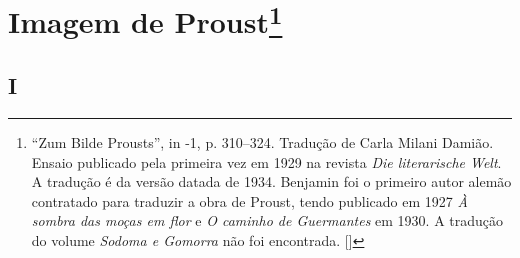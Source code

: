 \chapter{Imagem de Proust\footnote[*]{``Zum Bilde Prousts'', in -1, p. 310--324. Tradução de Carla Milani Damião. Ensaio publicado pela primeira vez em 1929 na revista \emph{Die literarische Welt}. A tradução é da versão datada de 1934. Benjamin foi o primeiro autor alemão contratado para traduzir a obra de Proust, tendo publicado em 1927 \emph{À sombra das moças em flor} e \emph{O caminho de Guermantes} em 1930. A tradução do volume \emph{Sodoma e Gomorra} não foi encontrada. []}}

\section{I}

